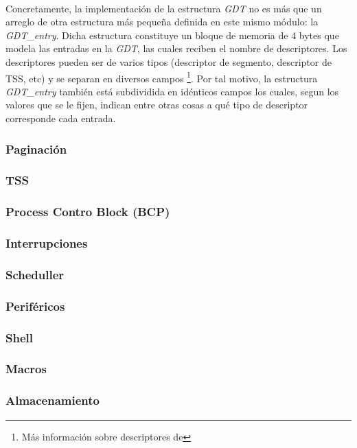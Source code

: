 \documentclass[11pt, a4paper]{article}
\begin{document}
			\paragraph{}
			Concretamente, la implementación de la estructura \textit{GDT} no es más que un arreglo de otra estructura más pequeña definida en este mismo módulo: la \textit{GDT\_entry}. Dicha estructura constituye un bloque de memoria de 4 bytes que modela las entradas en la \textit{GDT}, las cuales reciben el nombre de descriptores. Los descriptores pueden ser de varios tipos (descriptor de segmento, descriptor de TSS, etc) y se separan en diversos campos \footnote{Más información sobre descriptores de}. Por tal motivo, la estructura \textit{GDT\_entry} también está subdividida en idénticos campos los cuales, segun los valores que se le fijen, indican entre otras cosas a qué tipo de descriptor corresponde cada entrada.
			
			
				
		\subsubsection{Paginación}
		\subsubsection{TSS}
		\subsubsection{Process Contro Block (BCP) }
		\subsubsection{Interrupciones}
		\subsubsection{Scheduller}
		\subsubsection{Periféricos}
		\subsubsection{Shell}
		\subsubsection{Macros}
		\subsubsection{Almacenamiento}
\end{document}
